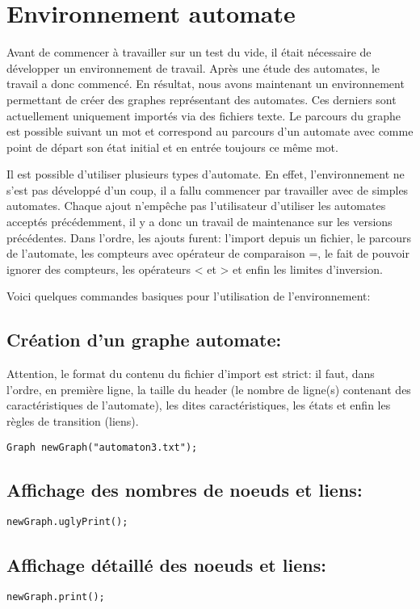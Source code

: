 \section{Environnement automate}
Avant de commencer à travailler sur un test du vide, il était nécessaire de développer un environnement de travail. Après une étude des automates, le travail a donc commencé. En résultat, nous avons maintenant un environnement permettant de créer des graphes représentant des automates. Ces derniers sont actuellement uniquement importés via des fichiers texte. Le parcours du graphe est possible suivant un mot et correspond au parcours d'un automate avec comme point de départ son état initial et en entrée toujours ce même mot.\par
Il est possible d'utiliser plusieurs types d'automate. En effet, l'environnement ne s'est pas développé d'un coup, il a fallu commencer par travailler avec de simples automates. Chaque ajout n'empêche pas l'utilisateur d'utiliser les automates acceptés précédemment, il y a donc un travail de maintenance sur les versions précédentes. Dans l'ordre, les ajouts furent: l'import depuis un fichier, le parcours de l'automate, les compteurs avec opérateur de comparaison =, le fait de pouvoir ignorer des compteurs, les opérateurs < et > et enfin les limites d'inversion.\par
Voici quelques commandes basiques pour l'utilisation de l'environnement:

\subsection{Création d'un graphe automate:}
Attention, le format du contenu du fichier d'import est strict: il faut, dans l'ordre, en première ligne, la taille du header (le nombre de ligne(s) contenant des caractéristiques de l'automate), les dites caractéristiques, les états et enfin les règles de transition (liens).
\begin{verbatim} 
Graph newGraph("automaton3.txt");
\end{verbatim}

\subsection{Affichage des nombres de noeuds et liens:}
\begin{verbatim} 
newGraph.uglyPrint();
\end{verbatim}

\subsection{Affichage détaillé des noeuds et liens:}
\begin{verbatim} 
newGraph.print();
\end{verbatim}

